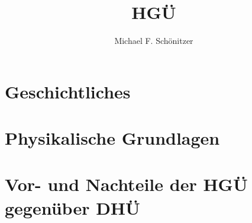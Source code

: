 \documentclass[10pt,a4paper,twoside]{article}
\author{Michael F. Schönitzer}
\title{HGÜ}
\begin{document}
\maketitle

\section{Geschichtliches}

\section{Physikalische Grundlagen}

\section{Vor- und Nachteile der HGÜ gegenüber DHÜ}
\end{document}
